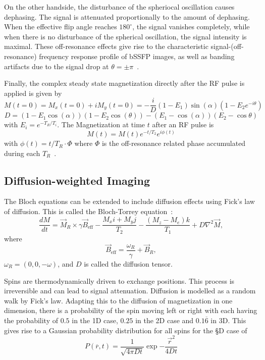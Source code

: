 On the other handside, the disturbance of the spheriocal oscillation causes dephasing.
The signal is attenuated proportionally to the amount of dephasing.
When the effective flip angle reaches $180^\circ$, the signal vanishes completely, while when there is no disturbance of the spherical oscillation, the signal intensity is maximal.
These off-resonance effects give rise to the characteristic signal-(off-resonance) frequency response profile of bSSFP images, as well as banding artifacts due to the signal drop at $\theta = \pm \pi$~\autocite{scheffler_principles_2003}.

Finally, the complex steady state magnetization directly after the RF pulse is applied is given by
\[ M(t = 0) = M_x(t = 0) + iM_y(t = 0) = -\frac{i}{D} (1 - E_1) \sin(\alpha)  (1 - E_2 e^{-i \theta}) \]
\[ D = (1 - E_1 \cos(\alpha)) (1 - E_2 \cos(\theta)) - (E_1 - \cos(\alpha)) (E_2 - \cos{\theta}) \]
with $E_i = e^{-T_R / T_i}$.
The Magnetization at time $t$ after an RF pulse is
\[ M(t) = M(t) e^{-t / T_2} e^{i \phi(t)} \]
with $\phi(t) = t / T_R \cdot \Phi$ where $\Phi$ is the off-resonance related phase accumulated during each $T_R$~\autocite{nguyen_motion-insensitive_2017, ganter_steady_2006}.


\subsection{Diffusion-weighted Imaging}\label{sec-dwi}
The Bloch equations can be extended to include diffusion effects using Fick's law of diffusion.
This is called the Bloch-Torrey equation~\autocite{torrey_bloch_1956}:
\[ \frac{dM}{dt} = \overrightarrow{M}_R \times \gamma \overrightarrow{B}_{\text{eff}} - \frac{M_{x} i + M_{y} j}{T_2} - \frac{(M_z - M_e) k }{T_1} + D\nabla^2 \overrightarrow{M}, \]
where \[ \overrightarrow{B}_{\text{eff}} = \frac{\omega_R}{\gamma} + \overrightarrow{B}_R, \] $\omega_R = \left( 0, 0, - \omega \right)$, and $D$ is called the diffusion tensor.

Spins are thermodynamically driven to exchange positions.
This process is irreversible and can lead to signal attenuation.
Diffusion is modelled as a random walk by Fick's law.
Adapting this to the diffusion of magnetization in one dimension, there is a probability of the spin moving left or right with each having the probability of $0.5$ in the 1D case, $0.25$ in the 2D case and $0.1\overline{6}$ in 3D.
This gives rise to a Gaussian probability distribution for all spins for the §D case of
\[ P(\overline{r}, t) = \frac{1}{\sqrt{4 \pi D t}} \exp{- \frac{\overrightarrow{r}^2}{4Dt}} \]

